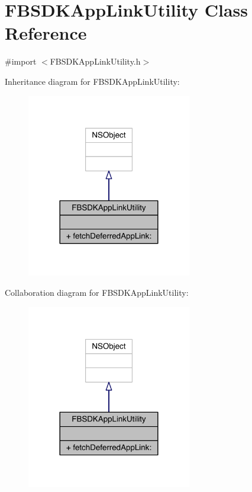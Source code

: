 \hypertarget{interface_f_b_s_d_k_app_link_utility}{\section{F\-B\-S\-D\-K\-App\-Link\-Utility Class Reference}
\label{interface_f_b_s_d_k_app_link_utility}
}


{\ttfamily \#import $<$F\-B\-S\-D\-K\-App\-Link\-Utility.\-h$>$}



Inheritance diagram for F\-B\-S\-D\-K\-App\-Link\-Utility\-:
\nopagebreak
\begin{figure}[H]
\begin{center}
\leavevmode
\includegraphics[width=204pt]{interface_f_b_s_d_k_app_link_utility__inherit__graph}
\end{center}
\end{figure}


Collaboration diagram for F\-B\-S\-D\-K\-App\-Link\-Utility\-:
\nopagebreak
\begin{figure}[H]
\begin{center}
\leavevmode
\includegraphics[width=204pt]{interface_f_b_s_d_k_app_link_utility__coll__graph}
\end{center}
\end{figure}
